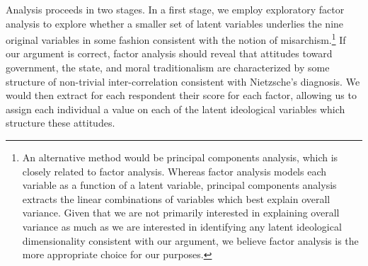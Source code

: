 \documentclass[12pt,]{article}
\begin{document}
Analysis proceeds in two stages. In a first stage, we employ exploratory
factor analysis to explore whether a smaller set of latent variables
underlies the nine original variables in some fashion consistent with
the notion of
misarchism.\footnote{An alternative method would be principal components analysis, which is closely related to factor analysis. Whereas factor analysis models each variable as a function of a latent variable, principal components analysis extracts the linear combinations of variables which best explain overall variance. Given that we are not primarily interested in explaining overall variance as much as we are interested in identifying any latent ideological dimensionality consistent with our argument, we believe factor analysis is the more appropriate choice for our purposes.}
If our argument is correct, factor analysis should reveal that attitudes
toward government, the state, and moral traditionalism are characterized
by some structure of non-trivial inter-correlation consistent with Nietzsche's diagnosis. We would then
extract for each respondent their score for each factor, allowing us to
assign each individual a value on each of the latent ideological
variables which structure these attitudes.
\end{document}
